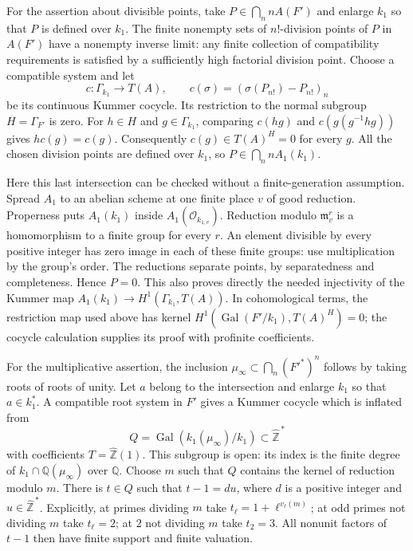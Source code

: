 For the assertion about divisible points, take $P\in\bigcap_n nA(F')$ and enlarge $k_1$ so that $P$ is defined over $k_1$. The finite nonempty sets of $n!$-division points of $P$ in $A(F')$ have a nonempty inverse limit: any finite collection of compatibility requirements is satisfied by a sufficiently high factorial division point. Choose a compatible system and let
\[
 c:\Gamma_{k_1}\longrightarrow T(A),\qquad
 c(\sigma)=(\sigma(P_{n!})-P_{n!})_n
\]
be its continuous Kummer cocycle. Its restriction to the normal subgroup $H=\Gamma_{F'}$ is zero. For $h\in H$ and $g\in\Gamma_{k_1}$, comparing $c(hg)$ and $c(g(g^{-1}hg))$ gives $h c(g)=c(g)$. Consequently $c(g)\in T(A)^H=0$ for every $g$. All the chosen division points are defined over $k_1$, so $P\in\bigcap_n nA_1(k_1)$.

Here this last intersection can be checked without a finite-generation assumption. Spread $A_1$ to an abelian scheme at one finite place $v$ of good reduction. Properness puts $A_1(k_1)$ inside $A_1(\mathcal O_{k_{1,v}})$. Reduction modulo $\mathfrak m_v^r$ is a homomorphism to a finite group for every $r$. An element divisible by every positive integer has zero image in each of these finite groups: use multiplication by the group's order. The reductions separate points, by separatedness and completeness. Hence $P=0$. This also proves directly the needed injectivity of the Kummer map $A_1(k_1)\to H^1(\Gamma_{k_1},T(A))$. In cohomological terms, the restriction map used above has kernel $H^1(\operatorname{Gal}(F'/k_1),T(A)^H)=0$; the cocycle calculation supplies its proof with profinite coefficients.

For the multiplicative assertion, the inclusion $\mu_\infty\subset\bigcap_n(F'^*)^n$ follows by taking roots of roots of unity. Let $a$ belong to the intersection and enlarge $k_1$ so that $a\in k_1^*$. A compatible root system in $F'$ gives a Kummer cocycle which is inflated from
\[
 Q=\operatorname{Gal}(k_1(\mu_\infty)/k_1)
 \subset\widehat{\mathbb Z}^{\,*}
\]
with coefficients $T=\widehat{\mathbb Z}(1)$. This subgroup is open: its index is the finite degree of $k_1\cap\mathbb Q(\mu_\infty)$ over $\mathbb Q$. Choose $m$ such that $Q$ contains the kernel of reduction modulo $m$. There is $t\in Q$ such that $t-1=du$, where $d$ is a positive integer and $u\in\widehat{\mathbb Z}^{\,*}$. Explicitly, at primes dividing $m$ take $t_\ell=1+\ell^{v_\ell(m)}$; at odd primes not dividing $m$ take $t_\ell=2$; at $2$ not dividing $m$ take $t_2=3$. All nonunit factors of $t-1$ then have finite support and finite valuation.

